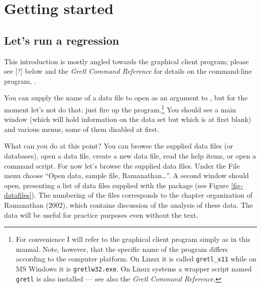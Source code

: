 \chapter{Getting started}
\label{getting-started}



\section{Let's run a regression}
\label{starting-regression}

This introduction is mostly angled towards the graphical client
program; please see [?] below and the \emph{Gretl Command Reference}
for details on the command-line program, .
    
You can supply the name of a data file to open as an argument to
, but for the moment let's not do that: just fire up the
program.\footnote{For convenience I will refer to the graphical client
  program simply as  in this manual. Note, however, that
  the specific name of the program differs according to the computer
  platform.  On Linux it is called \verb+gretl_x11+ while on MS
  Windows it is \verb+gretlw32.exe+. On Linux systems a wrapper script
  named \verb+gretl+ is also installed --- see also the \emph{Gretl
    Command Reference}.} You should see a main window (which will hold
information on the data set but which is at first blank) and various
menus, some of them disabled at first.
    
What can you do at this point?  You can browse the supplied data files
(or databases), open a data file, create a new data file, read the
help items, or open a command script.  For now let's browse the
supplied data files.  Under the File menu choose ``Open data, sample
file, Ramanathan\dots{}''.  A second window should open, presenting a
list of data files supplied with the package (see Figure
\ref{fig-datafiles}).  The numbering of the files corresponds to the
chapter organization of Ramanathan (2002), which contains discussion
of the analysis of these data. The data will be useful for practice
purposes even without the text.
    
